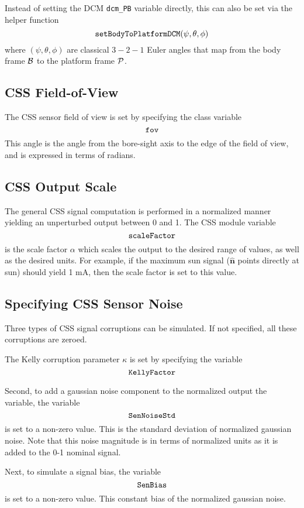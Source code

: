 Instead of setting the DCM {\tt dcm\_PB} variable directly, this can also be set via the helper function
$$
	{\tt setBodyToPlatformDCM}(\psi, \theta, \phi)
$$
where $(\psi, \theta, \phi)$ are classical $3-2-1$ Euler angles that map from the body frame $\cal B$ to the platform frame $\cal P$.  




\subsection{CSS Field-of-View}
The CSS sensor field of view is set by specifying the class variable
$$
	{\tt fov}
$$
This angle is the angle from the bore-sight axis to the edge of the field of view, and is expressed in terms of radians.  





\subsection{CSS Output Scale}
The general CSS signal computation is performed in a normalized manner yielding an unperturbed output between 0 and 1.  The CSS module variable
$$
	{\tt scaleFactor}
$$
is the scale factor $\alpha$ which scales the output to the desired range of values, as well as the desired units.  For example, if the maximum sun signal ($\hat{\bm n}$ points directly at sun) should yield 1 mA, then the scale factor is set to this value.    



\subsection{Specifying CSS Sensor Noise}
Three types of CSS signal corruptions can be simulated.  If not specified, all these corruptions are zeroed.  

The Kelly corruption parameter $\kappa$ is set by specifying the variable
$$
	{\tt KellyFactor}
$$

Second, to add a gaussian noise component to the normalized output the variable, the variable
$$
	{\tt SenNoiseStd}
$$
is set to a non-zero value.  This is the standard deviation of normalized gaussian noise.  Note that this noise magnitude is in terms of normalized units as it is added to the 0-1 nominal signal.  

Next, to simulate a signal bias, the variable
$$
	{\tt SenBias}
$$
is set to a non-zero value.   This constant bias of the normalized gaussian noise.  

